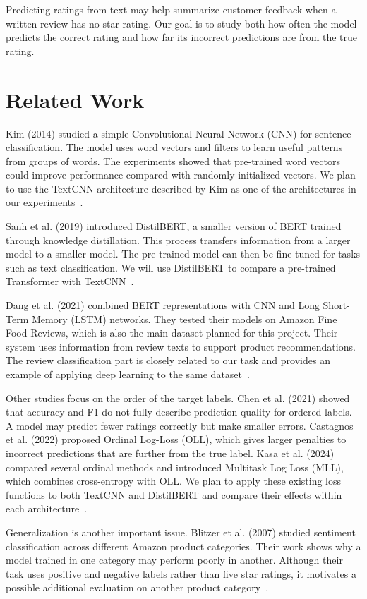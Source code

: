 \documentclass[conference,a4paper,9pt]{IEEEtran}
\begin{document}
Predicting ratings from text may help summarize customer feedback when a written review has no star rating. Our goal is to study both how often the model predicts the correct rating and how far its incorrect predictions are from the true rating.

\section{Related Work}

Kim (2014) studied a simple Convolutional Neural Network (CNN) for sentence classification. The model uses word vectors and filters to learn useful patterns from groups of words. The experiments showed that pre-trained word vectors could improve performance compared with randomly initialized vectors. We plan to use the TextCNN architecture described by Kim as one of the architectures in our experiments~\cite{kim2014}.

Sanh et al. (2019) introduced DistilBERT, a smaller version of BERT trained through knowledge distillation. This process transfers information from a larger model to a smaller model. The pre-trained model can then be fine-tuned for tasks such as text classification. We will use DistilBERT to compare a pre-trained Transformer with TextCNN~\cite{sanh2019}.

Dang et al. (2021) combined BERT representations with CNN and Long Short-Term Memory (LSTM) networks. They tested their models on Amazon Fine Food Reviews, which is also the main dataset planned for this project. Their system uses information from review texts to support product recommendations. The review classification part is closely related to our task and provides an example of applying deep learning to the same dataset~\cite{dang2021}.

Other studies focus on the order of the target labels. Chen et al. (2021) showed that accuracy and F1 do not fully describe prediction quality for ordered labels. A model may predict fewer ratings correctly but make smaller errors. Castagnos et al. (2022) proposed Ordinal Log-Loss (OLL), which gives larger penalties to incorrect predictions that are further from the true label. Kasa et al. (2024) compared several ordinal methods and introduced Multitask Log Loss (MLL), which combines cross-entropy with OLL. We plan to apply these existing loss functions to both TextCNN and DistilBERT and compare their effects within each architecture~\cite{chen2021,castagnos2022,kasa2024}.

Generalization is another important issue. Blitzer et al. (2007) studied sentiment classification across different Amazon product categories. Their work shows why a model trained in one category may perform poorly in another. Although their task uses positive and negative labels rather than five star ratings, it motivates a possible additional evaluation on another product category~\cite{blitzer2007}.
\end{document}
